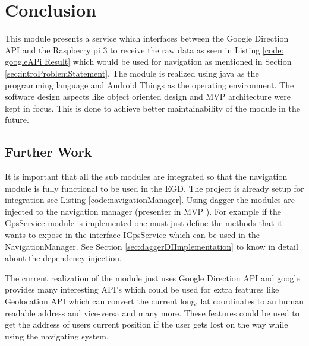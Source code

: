\newpage
\chapter{Conclusion}
    This module presents a service which interfaces
    between the Google Direction API and the Raspberry pi 3
    to receive the raw data as seen in Listing 
    \ref{code: googleAPi Result} which would be 
    used for navigation
    as mentioned in Section \ref{sec:introProblemStatement}.
    The module is realized using java as the programming 
    language and Android Things \cite{androidThings} as the
    operating environment. The software design aspects like
    object oriented design and MVP \cite{mvp} architecture 
    were kept in focus. This is done to achieve  
    better maintainability of the module in the future.
   
\section{Further Work}
    It is important that all the sub modules are integrated
    so that the navigation module is fully functional to be used in the
    EGD. The project is already setup for integration see Listing 
    \ref{code:navigationManager}. Using dagger \cite{SquareDagger} the
    modules are injected
    to the navigation manager (presenter in MVP \cite{mvp}). 
    For example if the
    GpsService module is implemented one must just define the methods
    that it wants to expose in the interface IGpsService 
    which can be used in the NavigationManager.
    See Section \ref{sec:daggerDIImplementation} to know in detail 
    about the dependency injection.
    
    The current realization of the module just uses Google Direction
    API \cite{googleDirecAPI} and google provides many interesting 
    API's which could be used for extra features like Geolocation API 
    which can convert the current long, lat coordinates to an 
    human readable address and vice-versa and many more. These features 
    could be used to get the address of users
    current position if the user gets lost on 
    the way while using the navigating system.

